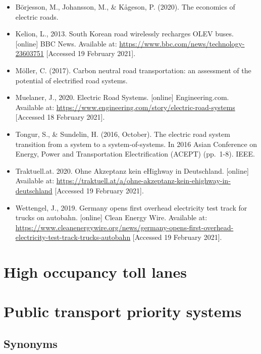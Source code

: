 \documentclass[
]{book}
\providecommand{\tightlist}{%
  \setlength{\itemsep}{0pt}\setlength{\parskip}{0pt}}
\begin{document}
\begin{itemize}
\tightlist
\item
  Börjesson, M., Johansson, M., \& Kågeson, P. (2020). The economics of electric roads.
\item
  Kelion, L., 2013. South Korean road wirelessly recharges OLEV buses. {[}online{]} BBC News. Available at: \url{https://www.bbc.com/news/technology-23603751} {[}Accessed 19 February 2021{]}.
\item
  Möller, C. (2017). Carbon neutral road transportation: an assessment of the potential of electrified road systems.
\item
  Muelaner, J., 2020. Electric Road Systems. {[}online{]} Engineering.com. Available at: \url{https://www.engineering.com/story/electric-road-systems} {[}Accessed 18 February 2021{]}.
\item
  Tongur, S., \& Sundelin, H. (2016, October). The electric road system transition from a system to a system-of-systems. In 2016 Asian Conference on Energy, Power and Transportation Electrification (ACEPT) (pp.~1-8). IEEE.
\item
  Traktuell.at. 2020. Ohne Akzeptanz kein eHighway in Deutschland. {[}online{]} Available at: \url{https://traktuell.at/a/ohne-akzeptanz-kein-ehighway-in-deutschland} {[}Accessed 19 February 2021{]}.
\item
  Wettengel, J., 2019. Germany opens first overhead electricity test track for trucks on autobahn. {[}online{]} Clean Energy Wire. Available at: \url{https://www.cleanenergywire.org/news/germany-opens-first-overhead-electricity-test-track-trucks-autobahn} {[}Accessed 19 February 2021{]}.
\end{itemize}

\hypertarget{high-occupancy-toll-lanes}{%
\section{High occupancy toll lanes}\label{high-occupancy-toll-lanes}}

\hypertarget{public-transport-priority-systems}{%
\section{Public transport priority systems}\label{public-transport-priority-systems}}

\hypertarget{synonyms-2}{%
\subsection*{Synonyms}\label{synonyms-2}}
\end{document}
